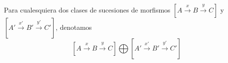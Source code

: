 \documentclass[preview]{standalone}
\begin{document}
\begin{center}
Para cualesquiera dos clases de sucesiones de morfismos $[A\xrightarrow{x}B\xrightarrow{y}C]$ y $[A'\xrightarrow{x'}B'\xrightarrow{y'}C']$, denotamos $$[A\xrightarrow{x}B\xrightarrow{y}C]\bigoplus[A'\xrightarrow{x'}B'\xrightarrow{y'}C'] $$
\end{center}
\end{document}
